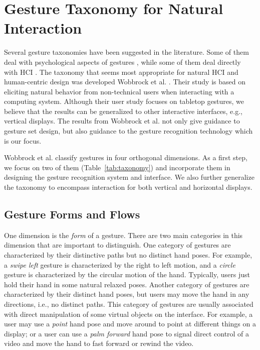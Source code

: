 \documentclass[conference]{IEEEtran}
\begin{document}
\section{Gesture Taxonomy for Natural Interaction}\label{sec:taxonomy}
Several gesture taxonomies have been suggested in the literature. Some of them
deal with psychological aspects of gestures \cite{kendon86, mcneill82}, while
some of them deal directly with HCI \cite{quek94,
quek95, Pavlovic97}. The taxonomy that seems most appropriate for natural HCI
and human-centric design was developed Wobbrock et al. \cite{wobbrock09}. Their
study is based on eliciting natural behavior from non-technical users when
interacting with a computing system. Although their user study focuses on
tabletop gestures, we believe that the results can be generalized to other
interactive interfaces, e.g., vertical displays. The results from Wobbrock et
al. not only give guidance to gesture set design, but also guidance to the
gesture recognition technology which is our focus.

Wobbrock et al. classify gestures in four orthogonal dimensions. As a first
step, we focus on two of them (Table~\ref{tab:taxonomy}) and incorporate them in
designing the gesture recognition system and interface. We also further generalize the
taxonomy to encompass interaction for both vertical and horizontal displays.

\subsection{Gesture Forms and Flows}
One dimension is the \textit{form} of a gesture. There are two main categories
in this dimension that are important to distinguish. One category of gestures are characterized
by their distinctive paths but no distinct hand poses. For
example, a \textit{swipe left} gesture is characterized by the right to left motion, and a \textit{circle} gesture is
characterized by the circular motion of the hand. Typically, users just
hold their hand in some natural relaxed poses. Another category of gestures are
characterized by their distinct hand poses, but users may move the hand in any
directions, i.e., no distinct paths. This category of gestures are usually
associated with direct manipulation of some virtual objects on the interface.
For example, a user may use a \textit{point} hand pose and move around to point at different things on a display; or a user can use a \textit{palm forward} hand pose to signal direct
control of a video and move the hand to fast forward or rewind the video. 
\end{document}
